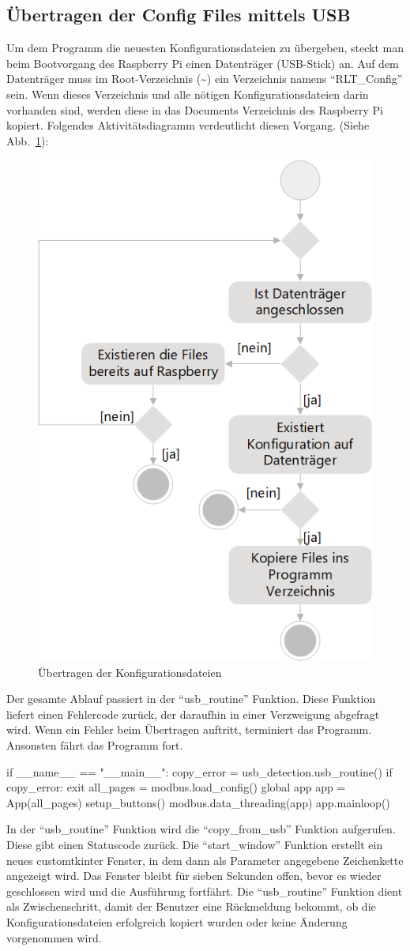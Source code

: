 \subsection{Übertragen der Config Files mittels USB}
Um dem Programm die neuesten Konfigurationsdateien zu übergeben, steckt man beim Bootvorgang des Raspberry Pi einen Datenträger (\zB USB-Stick) an. Auf dem Datenträger muss im Root-Verzeichnis (\textasciitilde) ein Verzeichnis namens \enquote{RLT\_Config} sein. Wenn dieses Verzeichnis und alle nötigen Konfigurationsdateien darin vorhanden sind, werden diese in das Documents Verzeichnis des Raspberry Pi kopiert. \newline Folgendes Aktivitätsdiagramm verdeutlicht diesen Vorgang. (Siehe Abb.~\ref{fig:config_ubertragen_activity}):
\begin{figure}[H]
	\centering
	\includegraphics[width=0.4\linewidth]{Bilder/config_ubertragen_activity_diagram}
	\caption{Übertragen der Konfigurationsdateien}
	\label{fig:config_ubertragen_activity}
\end{figure}

Der gesamte Ablauf passiert in der \enquote{usb\_routine} Funktion. Diese Funktion liefert einen Fehlercode zurück, der daraufhin in einer Verzweigung abgefragt wird. Wenn ein Fehler beim Übertragen auftritt, terminiert das Programm. Ansonsten fährt das Programm fort.
\begin{pythoncode}
if __name__ == "__main__":
	copy_error = usb_detection.usb_routine()
	if copy_error:
		exit
	all_pages = modbus.load_config()
	global app
	app = App(all_pages)
	setup_buttons()
	modbus.data_threading(app)
	app.mainloop()	
\end{pythoncode}

In der \enquote{usb\_routine} Funktion wird die \enquote{copy\_from\_usb} Funktion aufgerufen. Diese gibt einen Statuscode zurück. Die \enquote{start\_window} Funktion erstellt ein neues customtkinter Fenster, in dem dann als Parameter angegebene Zeichenkette angezeigt wird. Das Fenster bleibt für sieben Sekunden offen, bevor es wieder geschlossen wird und die Ausführung fortfährt. Die \enquote{usb\_routine} Funktion dient als Zwischenschritt, damit der Benutzer eine Rückmeldung bekommt, ob die Konfigurationsdateien erfolgreich kopiert wurden oder keine Änderung vorgenommen wird.

